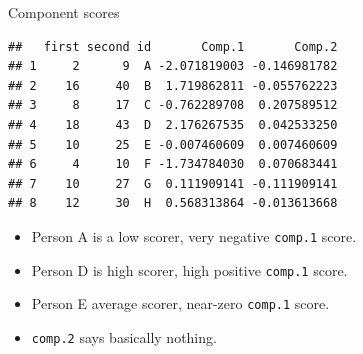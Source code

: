 \documentclass[ignorenonframetext,]{beamer}
\newenvironment{Shaded}{\begin{snugshade}}{\end{snugshade}}
\newcommand{\KeywordTok}[1]{\textcolor[rgb]{0.13,0.29,0.53}{\textbf{#1}}}
\newcommand{\NormalTok}[1]{#1}
\newcommand{\OperatorTok}[1]{\textcolor[rgb]{0.81,0.36,0.00}{\textbf{#1}}}
\newcommand{\StringTok}[1]{\textcolor[rgb]{0.31,0.60,0.02}{#1}}
\begin{document}
\begin{frame}[fragile]{Component scores}
\protect\hypertarget{component-scores}{}

\small

\begin{Shaded}
\end{Shaded}

\begin{verbatim}
##   first second id       Comp.1       Comp.2
## 1     2      9  A -2.071819003 -0.146981782
## 2    16     40  B  1.719862811 -0.055762223
## 3     8     17  C -0.762289708  0.207589512
## 4    18     43  D  2.176267535  0.042533250
## 5    10     25  E -0.007460609  0.007460609
## 6     4     10  F -1.734784030  0.070683441
## 7    10     27  G  0.111909141 -0.111909141
## 8    12     30  H  0.568313864 -0.013613668
\end{verbatim}

\normalsize

\begin{itemize}
\item
  Person A is a low scorer, very negative \texttt{comp.1} score.
\item
  Person D is high scorer, high positive \texttt{comp.1} score.
\item
  Person E average scorer, near-zero \texttt{comp.1} score.
\item
  \texttt{comp.2} says basically nothing.
\end{itemize}

\end{frame}
\end{document}
